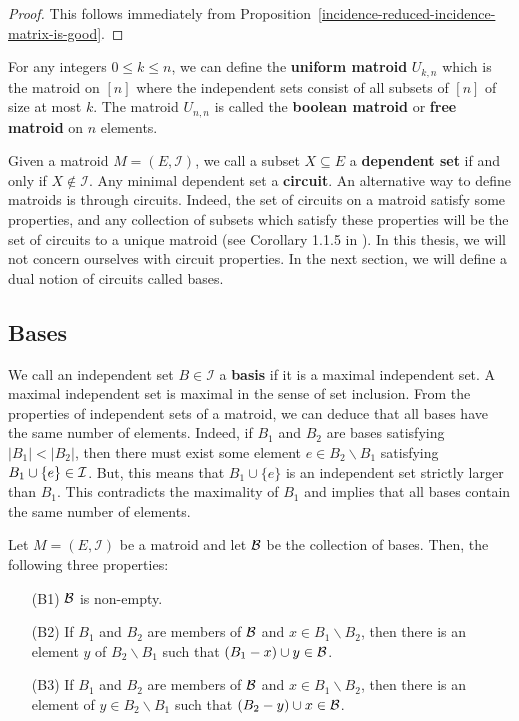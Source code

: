 \documentclass{puthesis-UG}
\begin{document}
\begin{proof}
	This follows immediately from Proposition~\ref{incidence-reduced-incidence-matrix-is-good}. 
\end{proof}

\begin{example}
	For any integers $0 \leq k \leq n$, we can define the \textbf{uniform matroid} $U_{k, n}$ which is the matroid on $[n]$ where the independent sets consist of all subsets of $[n]$ of size at most $k$. The matroid $U_{n, n}$ is called the \textbf{boolean matroid} or \textbf{free matroid} on $n$ elements. 
\end{example}


Given a matroid $M = (E, \mathcal{I})$, we call a subset $X \subseteq E$ a \textbf{dependent set} if and only if $X \notin \mathcal{I}$. Any minimal dependent set a \textbf{circuit}. An alternative way to define matroids is through circuits. Indeed, the set of circuits on a matroid satisfy some properties, and any collection of subsets which satisfy these properties will be the set of circuits to a unique matroid (see Corollary 1.1.5 in \cite{10.5555/1197093}). In this thesis, we will not concern ourselves with circuit properties. In the next section, we will define a dual notion of circuits called bases.

\subsection{Bases} \label{sec:bases}

We call an independent set $B \in \mathcal{I}$ a \textbf{basis} if it is a maximal independent set. A maximal independent set is maximal in the sense of set inclusion. From the properties of independent sets of a matroid, we can deduce that all bases have the same number of elements. Indeed, if $B_1$ and $B_2$ are bases satisfying $|B_1| < |B_2|$, then there must exist some element $e \in B_2 \backslash B_1$ satisfying $B_1 \cup \{e\} \in \mathcal{I}$. But, this means that $B_1 \cup \{e\}$ is an independent set strictly larger than $B_1$. This contradicts the maximality of $B_1$ and implies that all bases contain the same number of elements. 

\begin{prop} \label{prop:matroid-bases}
	Let $M = (E, \mathcal{I})$ be a matroid and let $\mathcal{B}$ be the collection of bases. Then, the following three properties:
	\begin{enumerate}
		\item[(B1)] $\mathcal{B}$ is non-empty.
		\item[(B2)] If $B_1$ and $B_2$ are members of $\mathcal{B}$ and $x \in B_1 \backslash B_2$, then there is an element $y$ of $B_2 \backslash B_1$ such that $(B_1 - x) \cup y \in \mathcal{B}$. 
		\item[(B3)] If $B_1$ and $B_2$ are members of $\mathcal{B}$ and $x \in B_1 \backslash B_2$, then there is an element of $y \in B_2 \backslash B_1$ such that $(B_2 - y) \cup x \in \mathcal{B}$. 
	\end{enumerate}
\end{prop}
\end{document}
